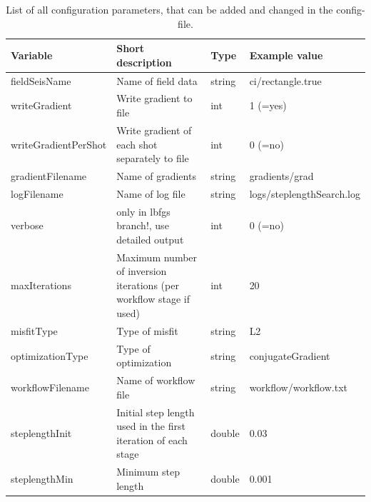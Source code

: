 \documentclass[pdftex,a4paper,parskip,listof=totoc,bibliography=totoc,onehalfspacing,12pt]{scrreprt}
\begin{document}
\begin{table}[h!]
\caption[List of all configuration parameters.]{List of all configuration parameters, that can be added and changed in the config-file.}\label{tab:config}
\centering
\begin{adjustbox}{width=1\textwidth,center=\textwidth}
	\begin{tabular}{llll}
	\toprule
         Variable                 & Short description                                                   & Type   & Example value \\
	\midrule
         fieldSeisName            & Name of field data                                                  & string & ci/rectangle.true  \\    
         writeGradient            & Write gradient to file                                              &  int   & 1 (=yes) \\
         writeGradientPerShot     & Write gradient of each shot separately to file                      &  int   & 0 (=no) \\
         gradientFilename         & Name of gradients                                                   & string & gradients/grad \\     
         logFilename              & Name of log file                                                    & string & logs/steplengthSearch.log  \\
         verbose                  & only in lbfgs branch!, use detailed output                          &  int   & 0 (=no) \\
        \midrule
         maxIterations            & Maximum number of inversion iterations (per workflow stage if used) &  int   & 20  \\                 
         misfitType               & Type of misfit                                                      & string & L2  \\
         optimizationType         & Type of optimization                                                & string & conjugateGradient \\
         workflowFilename         & Name of workflow file                                               & string & workflow/workflow.txt \\
        \midrule
         steplengthInit           & Initial step length used in the first iteration of each stage       & double & 0.03  \\
         steplengthMin            & Minimum step length                                                 & double & 0.001 \\

\end{tabular}
\end{adjustbox}
\end{table}
\end{document}
